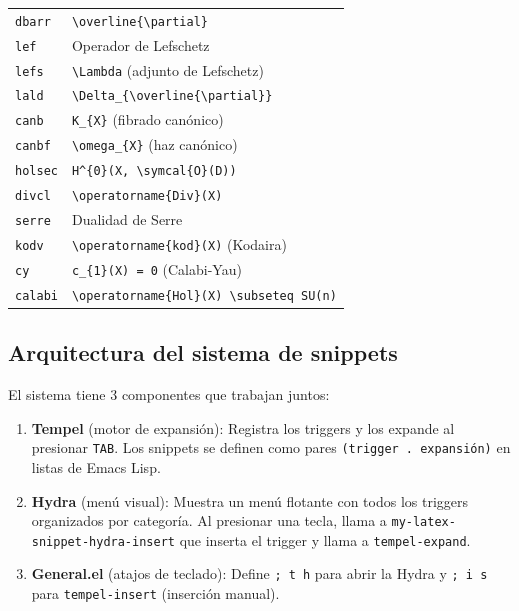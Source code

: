 \documentclass[11pt]{article}
\begin{document}
\begin{center}
\begin{tabular}{ll}
\texttt{dbarr} & \texttt{\textbackslash{}overline\{\textbackslash{}partial\}}\\
\texttt{lef} & Operador de Lefschetz\\
\texttt{lefs} & \texttt{\textbackslash{}Lambda} (adjunto de Lefschetz)\\
\texttt{lald} & \texttt{\textbackslash{}Delta\_\{\textbackslash{}overline\{\textbackslash{}partial\}\}}\\
\texttt{canb} & \texttt{K\_\{X\}} (fibrado canónico)\\
\texttt{canbf} & \texttt{\textbackslash{}omega\_\{X\}} (haz canónico)\\
\texttt{holsec} & \texttt{H\textasciicircum{}\{0\}(X, \textbackslash{}symcal\{O\}(D))}\\
\texttt{divcl} & \texttt{\textbackslash{}operatorname\{Div\}(X)}\\
\texttt{serre} & Dualidad de Serre\\
\texttt{kodv} & \texttt{\textbackslash{}operatorname\{kod\}(X)} (Kodaira)\\
\texttt{cy} & \texttt{c\_\{1\}(X) = 0} (Calabi-Yau)\\
\texttt{calabi} & \texttt{\textbackslash{}operatorname\{Hol\}(X) \textbackslash{}subseteq SU(n)}\\
\end{tabular}
\end{center}
\subsection{Arquitectura del sistema de snippets}
\label{sec:org5fbec2f}

El sistema tiene 3 componentes que trabajan juntos:

\begin{enumerate}
\item \textbf{Tempel} (motor de expansión): Registra los triggers y los expande al presionar \texttt{TAB}. Los snippets se definen como pares \texttt{(trigger . expansión)} en listas de Emacs Lisp.
\item \textbf{Hydra} (menú visual): Muestra un menú flotante con todos los triggers organizados por categoría. Al presionar una tecla, llama a \texttt{my-latex-snippet-hydra-insert} que inserta el trigger y llama a \texttt{tempel-expand}.
\item \textbf{General.el} (atajos de teclado): Define \texttt{; t h} para abrir la Hydra y \texttt{; i s} para \texttt{tempel-insert} (inserción manual).
\end{enumerate}
\end{document}
